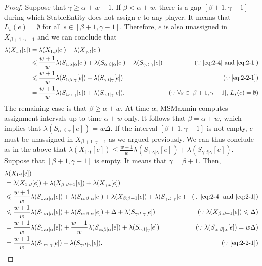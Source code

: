 \documentclass[11pt,a4paper]{article}
\renewcommand{\leq}{\leqslant}
\renewcommand{\geq}{\geqslant}
\begin{document}
\begin{proof}
	Suppose that $\gamma \geq \alpha+w+1$.  If $\beta < \alpha+w$, there is a gap $[\beta+1,\gamma-1]$ during which StableEntity does not assign $e$ to any player.  It means that $L_s(e) = \emptyset$ for all $s \in [\beta+1,\gamma-1]$.  Therefore, $e$ is also unassigned in $X_{\beta+1:\gamma-1}$ and we can conclude that
	\begin{align*}
		\lambda(X_{1:t}[e]) 
		& = \lambda(X_{1:\beta}[e]) +\lambda(X_{\gamma:t}[e]) \\
		& \leq \frac{w+1}{w}\lambda(S_{1:\alpha|\alpha}[e]) + \lambda(S_{\alpha:\beta|\alpha}[e]) + \lambda(S_{\gamma:t|\gamma}[e]) &  (\because \eqref{eq:2-4}~\text{and}~\eqref{eq:2-1}) \\
		& \leq \frac{w+1}{w}\lambda(S_{1:\beta|\gamma}[e]) + \lambda(S_{\gamma:t|\gamma}[e]) 
		& (\because \eqref{eq:2-2-1}) \\
		& = \frac{w+1}{w}\lambda(S_{1:\gamma|\gamma}[e]) + \lambda(S_{\gamma:t|\gamma}[e]).
		& (\because \forall s \in [\beta+1,\gamma-1],\, L_s(e) = \emptyset)
	\end{align*}
	The remaining case is that $\beta \geq \alpha+w$.  At time $\alpha$, MSMaxmin computes assignment intervals up to time $\alpha+w$ only.  It follows that $\beta = \alpha+w$, which implies that $\lambda(S_{\alpha:\beta|\alpha}[e]) = w\Delta$.  If the interval $[\beta+1,\gamma-1]$ is not empty, $e$ must be unassigned in $X_{\beta+1:\gamma-1}$ as we argued previously.  We can thus conclude as in the above that 	$\lambda(X_{1:t}[e]) \leq \frac{w+1}{w}\lambda(S_{1:\gamma|\gamma}[e]) + \lambda(S_{\gamma:t|\gamma}[e])$.  Suppose that $[\beta+1,\gamma-1]$ is empty.  It means that $\gamma = \beta+1$.  Then,
	\begin{align*}
		& \lambda(X_{1:t}[e]) \\
		& = \lambda(X_{1:\beta}[e]) + \lambda(X_{\beta:\beta+1}[e]) + \lambda(X_{\gamma:t}[e]) \\
		& \leq \frac{w+1}{w}\lambda(S_{1:\alpha|\alpha}[e]) + \lambda(S_{\alpha:\beta|\alpha}[e]) + \lambda(X_{\beta:\beta+1}[e]) + \lambda(S_{\gamma:t|\gamma}[e]) & (\because \eqref{eq:2-4}~\text{and}~\eqref{eq:2-1})\\
		& \leq \frac{w+1}{w}\lambda(S_{1:\alpha|\alpha}[e]) + \lambda(S_{\alpha:\beta|\alpha}[e]) + \Delta + \lambda(S_{\gamma:t|\gamma}[e]) 
		& (\because \lambda(X_{\beta:\beta+1}[e]) \leq \Delta) \\
		& = \frac{w+1}{w}\lambda(S_{1:\alpha|\alpha}[e]) + \frac{w+1}{w}\lambda(S_{\alpha:\beta|\alpha}[e]) + \lambda(S_{\gamma:t|\gamma}[e]) 
		& (\because \lambda(S_{\alpha:\beta|\alpha}[e]) = w\Delta) \\
		& = \frac{w+1}{w}\lambda(S_{1:\gamma|\gamma}[e]) + \lambda(S_{\gamma:t|\gamma}[e]).  
		& (\because \eqref{eq:2-2-1})
	\end{align*}
\end{proof}
\end{document}
